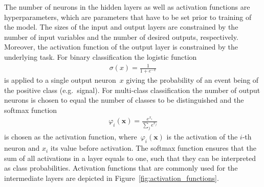 The number of neurons in the hidden layers as well as activation functions are
hyperparameters, which are parameters that have to be set prior to training of
the model. The sizes of the input and output layers are constrained by the
number of input variables and the number of desired outputs, respectively.
Moreover, the activation function of the output layer is constrained by the
underlying task. For binary classification the logistic function
\begin{align*}
  \sigma(x) = \frac{1}{1 + e^{-x}}
\end{align*}
is applied to a single output neuron~$x$ giving the probability of an event
being of the positive class (e.g.\ signal). For multi-class classification the
number of output neurons is chosen to equal the number of classes to be
distinguished and the softmax function \cite{esl, bishop}
\begin{align*}
  \varphi_i(\mathbf{x}) = \frac{e^{x_i}}{\sum_j e^{x_j}}
\end{align*}
is chosen as the activation function, where~$\varphi_i(\mathbf{x})$ is the
activation of the $i$-th neuron and $x_i$ its value before activation. The
softmax function ensures that the sum of all activations in a layer equals to
one, such that they can be interpreted as class probabilities. Activation
functions that are commonly used for the intermediate layers are depicted in
Figure~\ref{fig:activation_functions}.

